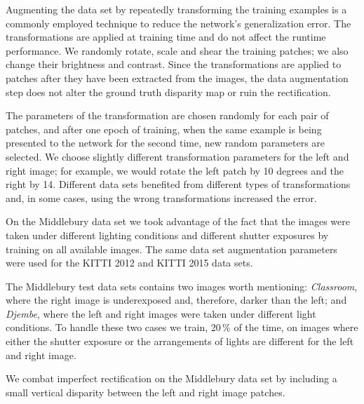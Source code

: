 \documentclass[twoside,11pt]{article}
\begin{document}
Augmenting the data set by repeatedly transforming the training examples is a
commonly employed technique to reduce the network's generalization error. The
transformations are applied at training time and do not affect the runtime
performance. We randomly rotate, scale and shear the training patches; we also
change their brightness and contrast.  Since the transformations are applied to
patches after they have been extracted from the images, the data
augmentation step does not alter the ground truth disparity map or ruin the
rectification.

The parameters of the transformation are chosen randomly for each pair of
patches, and after one epoch of training, when the same example is being
presented to the network for the second time, new random parameters are
selected.  We choose slightly different transformation parameters for the left
and right image; for example, we would rotate the left patch by 10 degrees and
the right by 14. Different data sets benefited from different types of
transformations and, in some cases, using the wrong transformations increased
the error. 

On the Middlebury data set we took advantage of the fact that the
images were taken under different lighting conditions and different shutter
exposures by training on all available images.  
%
The same data set augmentation parameters were used for the KITTI 2012 and
KITTI 2015 data sets.

The Middlebury test data sets contains two images worth mentioning:
\emph{Classroom}, where the right image is underexposed and, therefore, darker
than the left; and \emph{Djembe}, where the left and right images were taken
under different light conditions. To handle these two cases we train, 20\,\% of
the time, on images where either the shutter exposure or the arrangements of
lights are different for the left and right image. 

We combat imperfect rectification on the Middlebury data set by including a
small vertical disparity between the left and right image patches. 
\end{document}
